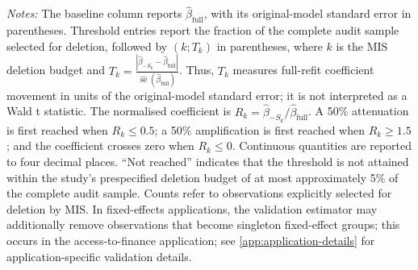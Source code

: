 \begin{table}[htbp]
\begin{minipage}{0.98\textwidth}
\textit{Notes:} The baseline column reports $\widehat{\beta}_{\mathrm{full}}$, with its original-model standard error in parentheses. Threshold entries report the fraction of the complete audit sample selected for deletion, followed by $(k;T_k)$ in parentheses, where $k$ is the MIS deletion budget and $T_k=\frac{|\widehat{\beta}_{-S_k}-\widehat{\beta}_{\mathrm{full}}|}{\widehat{\operatorname{se}}(\widehat{\beta}_{\mathrm{full}})}$. Thus, $T_k$ measures full-refit coefficient movement in units of the original-model standard error; it is not interpreted as a Wald t statistic. The normalised coefficient is $R_k=\widehat{\beta}_{-S_k}/\widehat{\beta}_{\mathrm{full}}$. A 50\% attenuation is first reached when $R_k\leq0.5$; a 50\% amplification is first reached when $R_k\geq1.5$; and the coefficient crosses zero when $R_k\leq0$. Continuous quantities are reported to four decimal places. ``Not reached'' indicates that the threshold is not attained within the study's prespecified deletion budget of at most approximately 5\% of the complete audit sample. Counts refer to observations explicitly selected for deletion by MIS. In fixed-effects applications, the validation estimator may additionally remove observations that become singleton fixed-effect groups; this occurs in the access-to-finance application; see \autoref{app:application-details} for application-specific validation details.
\end{minipage}
\end{table}
